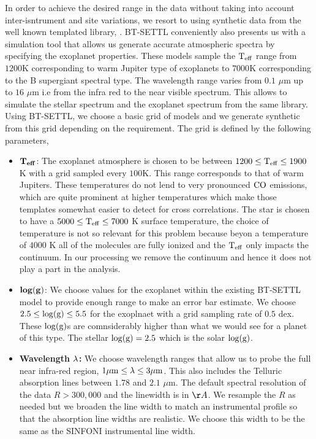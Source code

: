 In order to achieve the desired range in the data without taking into account inter-isntrument and site variations, we resort to using synthetic data from the well known templated library, \citep[\textsc{BT-SETTL},][]{1997Allard,2011Allard}.
\textsc{BT-SETTL} conveniently also presents us with a simulation tool \citep[\textsc{PHOENIX},][]{2011Allard} that allows us generate accurate atmospheric spectra by specifying the exoplanet properties.
These models sample the $\rm{T_{eff}}$ range from $1200$K corresponding to warm Jupiter type of exoplanets to $7000$K corresponding to the B supergiant spectral type.
The wavelength range varies from $0.1$ $\mu$m up to $16$ $\mu$m i.e from the infra red to the near visible spectrum. 
This allows to simulate the stellar spectrum and the exoplanet spectrum from the same library.
Using BT-SETTL, we choose a basic grid of models and we generate synthetic from this grid depending on the requirement.
The grid is defined by the following parameters,
\begin{itemize}
    \item[] $\rm{\mathbf{T_{eff}}}$: The exoplanet atmosphere is chosen to be between $1200\le \rm{T_{eff}}\le 1900$ K with a grid sampled every $100$K. 
    This range corresponds to that of warm Jupiters. 
    These temperatures do not lend to very pronounced $\rm{CO}$ emissions, which are quite prominent at higher temperatures which make those templates somewhat easier to detect for cross correlations. 
    The star is chosen to have a $5000\le \rm{T_{eff}}\le 7000$ K surface temperature, the choice of temperature is not so relevant for this problem because beyon a temperature of $4000$ K all of the molecules are fully ionized and the $\rm{T_{eff}}$ only impacts the continuum. 
    In our processing we remove the continuum and hence it does not play a part in the analysis.
    \item []$\rm{\mathbf{log(g)}}$: We choose values for the exoplanet within the existing BT-SETTL model to provide enough range to make an error bar estimate. 
    We choose $2.5\le \rm{\log(g)} \le 5.5$ for the exoplnaet with a grid sampling rate of $0.5$ dex. 
    These $\rm{\log(g)}$s are comnsiderably higher than what we would see for a planet of this type.
    The stellar $\rm{\log(g)} = 2.5$ which is the solar $\rm{\log(g)}$.
    \item []\textbf{Wavelength $\rm{\mathbf{\lambda}}$:} We choose wavelength ranges that allow us to probe the full near infra-red region, $1 \mu\rm{m} \le \lambda \le 3 \mu \rm{m}$.
    This also includes the Telluric absorption lines between $1.78$ and $2.1$ $\mu$m.
    The default spectral resolution of the data $R>300,000$ and the linewidth is in $\AA$. 
    We resample the $R$ as needed but we broaden the line width to match an instrumental profile so that the absorption line widths are realistic.
    We choose this width to be the same as the SINFONI instrumental line width.
\end{itemize}

